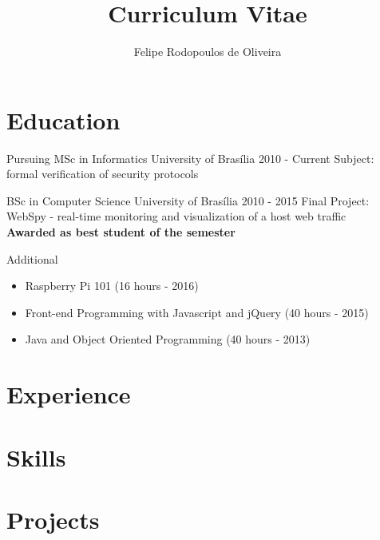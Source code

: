\documentclass{cv}
\title{Curriculum Vitae}
\author{Felipe Rodopoulos de Oliveira}
\begin{document}
  \maketitle

  \section{Education}
  \begin{chronoitem}
    {Pursuing MSc in Informatics} {University of Brasília} {2010 - Current}
    Subject: formal verification of security protocols
  \end{chronoitem}

  \begin{chronoitem}
    {BSc in Computer Science} {University of Brasília} {2010 - 2015}
    Final Project: WebSpy - real-time monitoring and visualization of a host web traffic \\
    \textbf{Awarded as best student of the semester}
  \end{chronoitem}

  \begin{chronoitem}
    {Additional}{}{}
    \begin{itemize}
      \item[] Raspberry Pi 101 \hfill (16 hours - 2016)
      \item[] Front-end Programming with Javascript and jQuery \hfill (40 hours - 2015)
      \item[] Java and Object Oriented Programming \hfill (40 hours - 2013)
    \end{itemize}
  \end{chronoitem}


  \section{Experience}
  \section{Skills}
  \section{Projects}
\end{document}
